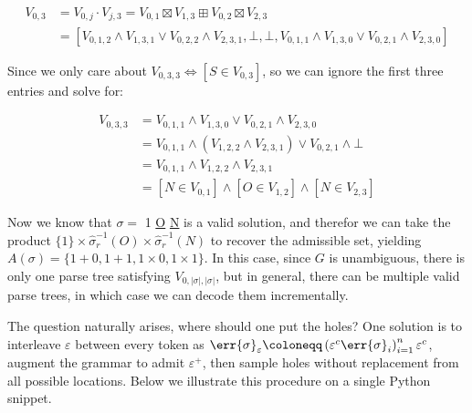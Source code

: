 \documentclass[runningheads]{llncs}
\begin{document}
\begin{align}
  V_{0, 3} &= V_{0, j} \cdot V_{j, 3} = V_{0, 1} \boxtimes V_{1, 3} \boxplus V_{0, 2} \boxtimes V_{2, 3}\\
  &= [V_{0, 1, 2} \land V_{1, 3, 1} \lor V_{0, 2, 2} \land V_{2, 3, 1}, \bot, \bot, V_{0, 1, 1} \land V_{1, 3, 0} \lor V_{0, 2, 1} \land V_{2, 3, 0}]
\end{align}

Since we only care about $V_{0, 3, 3} \Leftrightarrow [S \in V_{0, 3}]$, so we can ignore the first three entries and solve for:

\begin{align}
V_{0, 3, 3} &= V_{0, 1, 1} \land V_{1, 3, 0} \lor V_{0, 2, 1} \land V_{2, 3, 0}\\
  &= V_{0, 1, 1} \land (V_{1, 2, 2} \land V_{2, 3, 1}) \lor V_{0, 2, 1} \land \bot\\
  &= V_{0, 1, 1} \land V_{1, 2, 2} \land V_{2, 3, 1}\\
  &= [N \in V_{0, 1}] \land [O \in V_{1, 2}] \land [N \in V_{2, 3}]
\end{align}

Now we know that $\sigma =$ 1 \underline{O} \underline{N} is a valid solution, and therefor we can take the product $\{1\}\times \hat\sigma_r^{-1}(O) \times \hat\sigma_r^{-1}(N)$ to recover the admissible set, yielding $A(\sigma)=\{1+0, 1+1, 1\times 0, 1\times 1\}$. In this case, since $G$ is unambiguous, there is only one parse tree satisfying $V_{0, |\sigma|, |\sigma|}$, but in general, there can be multiple valid parse trees, in which case we can decode them incrementally.

The question naturally arises, where should one put the holes? One solution is to interleave $\varepsilon$ between every token as $\err{\sigma}_\varepsilon\coloneqq \left(\varepsilon^c\err{\sigma}_i\right)_{i=1}^n\varepsilon^c$, augment the grammar to admit $\varepsilon^+$, then sample holes without replacement from all possible locations. Below we illustrate this procedure on a single Python snippet.

%
%
%
\end{document}
